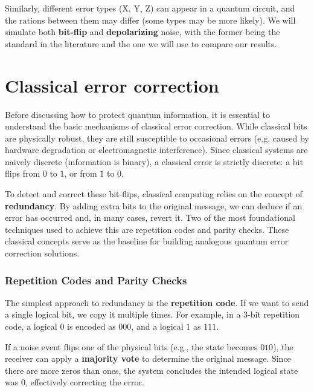 Similarly, different error types (X, Y, Z) can appear in a quantum circuit, and the rations between them may differ (some types may be more likely). We will simulate both \textbf{bit-flip} and \textbf{depolarizing} noise, with the former being the standard in the literature and the one we will use to compare our results.

\section{Classical error correction}
\label{sec:classical_error}

Before discussing how to protect quantum information, it is essential to understand the basic mechanisms of classical error correction. While classical bits are physically robust, they are still susceptible to occasional errors (e.g. caused by hardware degradation or electromagnetic interference). Since classical systems are naively discrete (information is binary), a classical error is strictly discrete: a bit flips from $0$ to $1$, or from $1$ to $0$.

To detect and correct these bit-flips, classical computing relies on the concept of \textbf{redundancy}. By adding extra bits to the original message, we can deduce if an error has occurred and, in many cases, revert it. Two of the most foundational techniques used to achieve this are repetition codes and parity checks. These classical concepts serve as the baseline for building analogous quantum error correction solutions.

\subsubsection*{Repetition Codes and Parity Checks}

The simplest approach to redundancy is the \textbf{repetition code}. If we want to send a single logical bit, we copy it multiple times. For example, in a 3-bit repetition code, a logical $0$ is encoded as $000$, and a logical $1$ as $111$. 

If a noise event flips one of the physical bits (e.g., the state becomes $010$), the receiver can apply a \textbf{majority vote} to determine the original message. Since there are more zeros than ones, the system concludes the intended logical state was $0$, effectively correcting the error.

